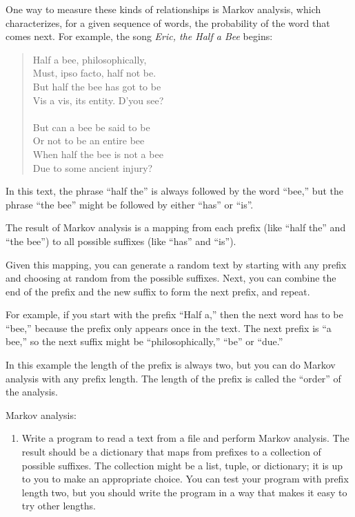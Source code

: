 \documentclass[10pt]{book}
\begin{document}
\begin{CJK}{UTF8}{gbsn}
One way to measure these kinds of relationships is Markov
analysis, which
characterizes, for a given sequence of words, the probability of the
word that comes next.  For example, the song {\em Eric, the Half a
  Bee} begins:

\begin{quote}
Half a bee, philosophically, \\
Must, ipso facto, half not be. \\
But half the bee has got to be \\
Vis a vis, its entity. D'you see? \\
\\
But can a bee be said to be \\
Or not to be an entire bee \\
When half the bee is not a bee \\
Due to some ancient injury? \\
\end{quote}
%
In this text,
the phrase ``half the'' is always followed by the word ``bee,''
but the phrase ``the bee'' might be followed by either
``has'' or ``is''.

The result of Markov analysis is a mapping from each prefix
(like ``half the'' and ``the bee'') to all possible suffixes
(like ``has'' and ``is'').

Given this mapping, you can generate a random text by
starting with any prefix and choosing at random from the
possible suffixes.  Next, you can combine the end of the
prefix and the new suffix to form the next prefix, and repeat.

For example, if you start with the prefix ``Half a,'' then the
next word has to be ``bee,'' because the prefix only appears
once in the text.  The next prefix is ``a bee,'' so the
next suffix might be ``philosophically,'' ``be'' or ``due.''

In this example the length of the prefix is always two, but
you can do Markov analysis with any prefix length.  The length
of the prefix is called the ``order'' of the analysis.

\begin{exercise}

Markov analysis:

\begin{enumerate}

\item Write a program to read a text from a file and perform Markov
analysis.  The result should be a dictionary that maps from
prefixes to a collection of possible suffixes.  The collection
might be a list, tuple, or dictionary; it is up to you to make
an appropriate choice.  You can test your program with prefix
length two, but you should write the program in a way that makes
it easy to try other lengths.


\end{enumerate}
\end{exercise}
\end{CJK}
\end{document}
